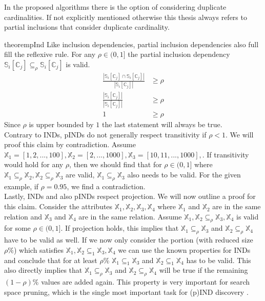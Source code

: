 In the proposed algorithms there is the option of considering duplicate cardinalities. If not explicitly mentioned otherwise this thesis always refers to partial inclusions that consider duplicate cardinality.

\begin{restatable}{theorem}{pInd}\label{theo:pInd}
    Like inclusion dependencies, partial inclusion dependencies also full fill the reflexive rule. For any $\rho \in (0, 1]$ the partial inclusion dependency $\mathbb{S}_i[\mathbb{C}_j] \subseteq_{\rho} \mathbb{S}_i[\mathbb{C}_j]$ is valid.
    \begin{align*}
        \frac{|\mathbb{S}_i[\mathbb{C}_j] \cap \mathbb{S}_i[\mathbb{C}_j]|}
            {|\mathbb{S}_i[\mathbb{C}_j]|} & \geq \rho \\
        \frac{|\mathbb{S}_i[\mathbb{C}_j]|}
            {|\mathbb{S}_i[\mathbb{C}_j]|} & \geq \rho \\
            1 & \geq \rho
     \end{align*}
     Since $\rho$ is upper bounded by $1$ the last statement will always be true. \\

     \noindent Contrary to INDs, pINDs do not generally respect transitivity if $\rho < 1$. We will proof this claim by contradiction. Assume $\mathbb{X}_1 = [1, 2, ..., 100], \mathbb{X}_2 = [2, ..., 1000], \mathbb{X}_3 = [10, 11, ..., 1000],$. If transitivity would hold for any $\rho$, then we should find that for $\rho \in (0, 1]$ where $\mathbb{X}_1 \subseteq_\rho \mathbb{X}_2, \mathbb{X}_2 \subseteq_\rho \mathbb{X}_3$ are valid, $\mathbb{X}_1 \subseteq_\rho \mathbb{X}_3$ also needs to be valid. For the given example, if $\rho = 0.95$, we find a contradiction. \\

     \noindent Lastly, INDs and also pINDs respect projection. We will now outline a proof for this claim. Consider the attributes $\mathbb{X}_1, \mathbb{X}_2, \mathbb{X}_3, \mathbb{X}_4$ where $\mathbb{X}_1$ and $\mathbb{X}_2$ are in the same relation and $\mathbb{X}_3$ and $\mathbb{X}_4$ are in the same relation. Assume $\mathbb{X}_1, \mathbb{X}_2 \subseteq_\rho \mathbb{X}_3, \mathbb{X}_4$ is valid for some $\rho \in (0, 1]$. If projection holds, this implies that $\mathbb{X}_1 \subseteq_\rho \mathbb{X}_3$ and $\mathbb{X}_2 \subseteq_\rho \mathbb{X}_4$ have to be valid as well. If we now only consider the portion (with reduced size $\rho\%$) which satisfies $\mathbb{X}_1, \mathbb{X}_2 \subseteq_1 \mathbb{X}_3, \mathbb{X}_4$ we can use the known properties for INDs and conclude that for at least $\rho\%$ $\mathbb{X}_1 \subseteq_1 \mathbb{X}_3$ and $\mathbb{X}_2 \subseteq_1 \mathbb{X}_4$ has to be valid. This also directly implies that $\mathbb{X}_1 \subseteq_\rho \mathbb{X}_3$ and $\mathbb{X}_2 \subseteq_\rho \mathbb{X}_4$ will be true if the remaining $(1-\rho)\%$ values are added again. This property is very important for search space pruning, which is the single most important task for (p)IND discovery \cite{liu2010discover}.
\end{restatable}

